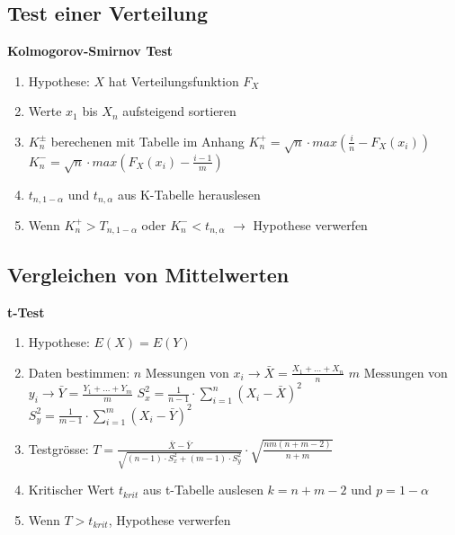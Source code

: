 \documentclass[margin=normal]{tex/hsrzf}
\begin{document}
\begin{minipage}{0.49\textwidth}
    \subsection{Test einer Verteilung}
    \textbf{Kolmogorov-Smirnov Test}
    \begin{enumerate}
        \item Hypothese: $X$ hat Verteilungsfunktion $F_X$
        \item Werte $x_1$ bis $X_n$ aufsteigend sortieren
        \item $K_n^{\pm}$ berechenen mit Tabelle im Anhang
              \newline $K_n^+ = \sqrt{n} \cdot max(\frac{i}{n}-F_X(x_i))$
              \newline $K_n^- = \sqrt{n} \cdot max(F_X(x_i) - \frac{i-1}{m})$
        \item $t_{n, 1-\alpha}$ und $t_{n, \alpha}$ aus K-Tabelle herauslesen
        \item Wenn $K_n^+ > T_{n, 1-\alpha}$ oder $K_n^- < t_{n, \alpha}$
              \newline $\rightarrow$ Hypothese verwerfen
    \end{enumerate}
\end{minipage}
\begin{minipage}{0.49\textwidth}

    \subsection{Vergleichen von Mittelwerten}
    \textbf{t-Test}
    \begin{enumerate}
        \item Hypothese: $E(X) = E(Y)$
        \item Daten bestimmen:
              \newline $n$ Messungen von $x_i \rightarrow \bar{X} = \frac{X_1 + \dots + X_n}{n}$
              \newline $m$ Messungen von $y_i \rightarrow \bar{Y} = \frac{Y_1 + \dots + Y_m}{m}$
              \newline $S^2_x = \frac{1}{n-1} \cdot \sum_{i=1}^{n}(X_i-\bar{X})^2$
              \newline $S^2_y = \frac{1}{m-1} \cdot \sum_{i=1}^{m}(X_i-\bar{Y})^2$
        \item Testgrösse:
              \newline $T = \frac{\bar{X} - \bar{Y}}{\sqrt{(n-1)
                          \cdot S^2_x + (m-1)\cdot S^2_y}}\cdot \sqrt{\frac{nm(n+m-2)}{n+m}}$

        \item Kritischer Wert $t_{krit}$ aus t-Tabelle auslesen
              \newline $k=n + m - 2$ und $p = 1- \alpha$
        \item Wenn $T>t_{krit}$, Hypothese verwerfen
    \end{enumerate}
\end{minipage}
\end{document}
